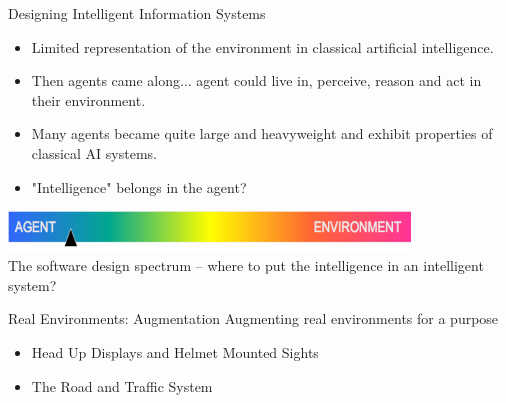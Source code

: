 \documentclass[aspectratio=1610,xcolor=dvipsnames,t]{beamer}
\begin{document}
\begin{frame}{Designing Intelligent Information Systems} 
    \begin{itemize}
        \item Limited representation of the environment in classical
              artificial intelligence.
        \item Then agents came along... agent could live in,
              perceive, reason and act in their environment.
        \item Many agents became quite large and heavyweight and
              exhibit properties of classical AI systems.
        \item "Intelligence" belongs in the agent?
    \end{itemize}
    \begin{center}
        \includegraphics[width=0.8\textwidth]{intel-spectrum} \\
        The software design spectrum -- where to put the intelligence in an
        intelligent system?
    \end{center}
\end{frame}

\begin{frame}{Real Environments: Augmentation} 
    Augmenting real environments for a purpose
    \begin{itemize}
        \item Head Up Displays and Helmet Mounted Sights
        \item The Road and Traffic System
    \end{itemize}
\end{frame} 
\end{document}
